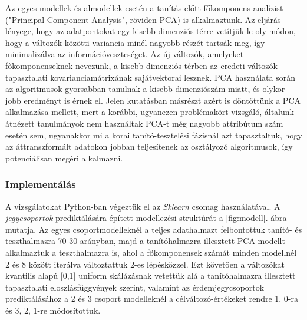 \documentclass[12pt]{article}
\begin{document}
Az egyes modellek és almodellek esetén a tanítás előtt főkomponens analízist ("Principal Component Analysis", röviden PCA) is alkalmaztunk. Az eljárás lényege, hogy az adatpontokat egy kisebb dimenziós térre vetítjük le oly módon, hogy a változók közötti variancia minél nagyobb részét tartsák meg, így minimalizálva az információveszteséget\cite{PCA}. Az új változók, amelyeket főkomponenseknek nevezünk, a kisebb dimenziós térben az eredeti változók tapasztalati kovarianciamátrixának sajátvektorai lesznek. PCA használata során az algoritmusok gyorsabban tanulnak a kisebb dimenziószám miatt, és olykor jobb eredményt is érnek el. Jelen kutatásban másrészt azért is döntöttünk a PCA alkalmazása mellett, mert a korábbi, ugyanezen problémakört vizsgáló, általunk átnézett tanulmányok nem használtak PCA-t még nagyobb attribútum szám esetén sem, ugyanakkor mi a korai tanító-tesztelési fázisnál azt tapasztaltuk, hogy az áttranszformált adatokon jobban teljesítenek az osztályozó algoritmusok, így potenciálisan megéri alkalmazni.

\subsubsection*{Implementálás}

A vizsgálatokat Python-ban végeztük el az \textit{Sklearn}\cite{sklearn} csomag használatával. A \textit{jegycsoportok} prediktálására épített modellezési struktúrát a \ref{fig:modell}. ábra mutatja. Az egyes csoportmodelleknél a teljes adathalmazt felbontottuk tanító- és teszthalmazra 70-30 arányban, majd a tanítóhalmazra illesztett PCA modellt alkalmaztuk a teszthalmazra is, ahol a főkomponensek számát minden modellnél 2 és 8 között iterálva változtattuk 2-es lépésközzel. Ezt követően a változókat kvantilis alapú [0,1] uniform skálázásnak vetettük alá a tanítóhalmazra illesztett tapasztalati eloszlásfüggvények szerint, valamint az érdemjegycsoportok prediktálásához a 2 és 3 csoport modelleknél a célváltozó-értékeket rendre 1, 0-ra és 3, 2, 1-re módosítottuk. 
\end{document}
